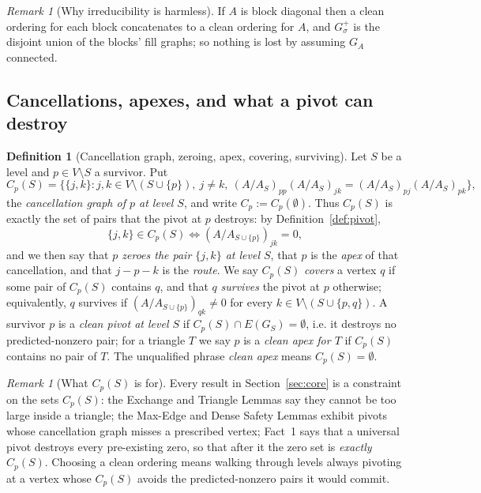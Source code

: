 \documentclass[11pt]{article}
\theoremstyle{plain}
\theoremstyle{definition}
\newtheorem{definition}[theorem]{Definition}
\theoremstyle{remark}
\newtheorem{remark}[theorem]{Remark}
\begin{document}
\begin{aiblock}
\begin{remark}[Why irreducibility is harmless]\label{rem:irred-harmless}
If $A$ is block diagonal then a clean ordering for each block concatenates to a clean ordering for
$A$, and $G^+_\sigma$ is the disjoint union of the blocks' fill graphs; so nothing is lost by assuming
$G_A$ connected.
\end{remark}

\subsection{Cancellations, apexes, and what a pivot can destroy}

\begin{definition}[Cancellation graph, zeroing, apex, covering, surviving]\label{def:cancel}
Let $S$ be a level and $p\in V\setminus S$ a survivor. Put
\[
C_p(S)=\bigl\{\{j,k\}: j,k\in V\setminus(S\cup\{p\}),\ j\neq k,\
(A/A_S)_{pp}(A/A_S)_{jk}=(A/A_S)_{pj}(A/A_S)_{pk}\bigr\},
\]
the \emph{cancellation graph of $p$ at level $S$}, and write $C_p:=C_p(\emptyset)$. Thus
$C_p(S)$ is exactly the set of pairs that the pivot at $p$ destroys: by
Definition~\ref{def:pivot},
\[
\{j,k\}\in C_p(S)\iff (A/A_{S\cup\{p\}})_{jk}=0 ,
\]
and we then say that \emph{$p$ zeroes the pair $\{j,k\}$ at level $S$}, that $p$ is the \emph{apex} of
that cancellation, and that $j-p-k$ is the \emph{route}. We say $C_p(S)$ \emph{covers} a vertex $q$ if
some pair of $C_p(S)$ contains $q$, and that $q$ \emph{survives} the pivot at $p$ otherwise;
equivalently, $q$ survives if $(A/A_{S\cup\{p\}})_{qk}\neq0$ for every
$k\in V\setminus(S\cup\{p,q\})$. A survivor $p$ is a \emph{clean pivot at level $S$} if
$C_p(S)\cap E(G_S)=\emptyset$, i.e. it destroys no predicted-nonzero pair; for a triangle
$T$ we say $p$ is a \emph{clean apex for $T$} if $C_p(S)$ contains no pair of $T$. The unqualified
phrase \emph{clean apex} means $C_p(S)=\emptyset$.
\end{definition}

\begin{remark}[What $C_p(S)$ is for]\label{rem:Cp-role}
Every result in Section~\ref{sec:core} is a constraint on the sets $C_p(S)$: the Exchange and Triangle
Lemmas say they cannot be too large inside a triangle; the Max-Edge and Dense Safety Lemmas exhibit
pivots whose cancellation graph misses a prescribed vertex; Fact~1 says that a universal pivot
destroys every pre-existing zero, so that after it the zero set is \emph{exactly} $C_p(S)$. Choosing a
clean ordering means walking through levels always pivoting at a vertex whose $C_p(S)$ avoids the
predicted-nonzero pairs it would commit.
\end{remark}


\end{aiblock}
\end{document}
